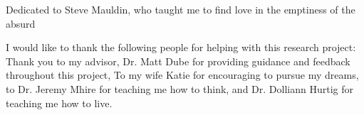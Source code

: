 \begin{dedication}
Dedicated to Steve Mauldin, who taught me to find love in the emptiness of the absurd 
\end{dedication}

\begin{acknowledgements}
I would like to thank the following people for helping with this research project:
Thank you to my advisor, Dr. Matt Dube for providing guidance and feedback throughout this project, To my wife Katie for encouraging to pursue my dreams, to Dr. Jeremy Mhire for teaching me how to think, and Dr. Dolliann Hurtig for teaching me how to live. 
\end{acknowledgements}

\pagebreak

\tableofcontents

\pagebreak

\listoftables				%
\pagebreak
\listoffigures		
\pagebreak		%



\mainmatter

\endinput
